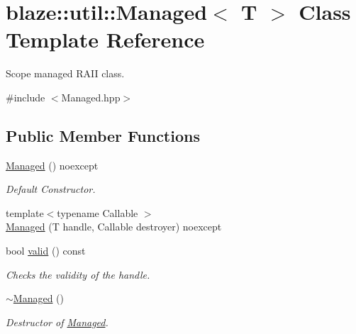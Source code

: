 \hypertarget{classblaze_1_1util_1_1Managed}{}\section{blaze\+:\+:util\+:\+:Managed$<$ T $>$ Class Template Reference}
\label{classblaze_1_1util_1_1Managed}


Scope managed R\+A\+II class.  




{\ttfamily \#include $<$Managed.\+hpp$>$}

\subsection*{Public Member Functions}
\begin{DoxyCompactItemize}
\item 
\mbox{\label{classblaze_1_1util_1_1Managed_a81d8a04a7d69c14f2e1b4cc53c22a9fb}} 
\hyperlink{classblaze_1_1util_1_1Managed_a81d8a04a7d69c14f2e1b4cc53c22a9fb}{Managed} () noexcept
\begin{DoxyCompactList}\small\item\em Default Constructor. \end{DoxyCompactList}\item 
{\footnotesize template$<$typename Callable $>$ }\\\hyperlink{classblaze_1_1util_1_1Managed_a1fbcd3a25982f170ba9ca3cd9feaee0b}{Managed} (T handle, Callable destroyer) noexcept
\item 
bool \hyperlink{classblaze_1_1util_1_1Managed_acaa4cd7a27ec898930f84162724d9f89}{valid} () const
\begin{DoxyCompactList}\small\item\em Checks the validity of the handle. \end{DoxyCompactList}\item 
\hyperlink{classblaze_1_1util_1_1Managed_a5e78234d198c17b18cb94936d68fe6ba}{$\sim$\+Managed} ()
\begin{DoxyCompactList}\small\item\em Destructor of \hyperlink{classblaze_1_1util_1_1Managed}{Managed}. \end{DoxyCompactList}\end{DoxyCompactItemize}
